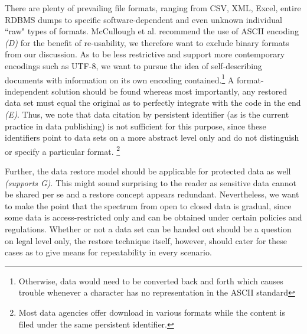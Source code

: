 \documentclass{acm_proc_article-sp}
\begin{document}
There are plenty of prevailing file formats, ranging from CSV, XML, Excel, entire RDBMS dumps to specific software-dependent and even unknown individual ``raw" types of formats.
McCullough et al. recommend the use of ASCII encoding \textit{(D)} for the benefit of re-usability, we therefore want to exclude binary formats from our discussion.
As to be less restrictive and support more contemporary encodings such as UTF-8, we want to pursue the idea of self-describing documents with information on its own encoding contained.\footnote{Otherwise, data would need to be converted back and forth which causes trouble whenever a character has no representation in the ASCII standard}
A format-independent solution should be found whereas most importantly, any restored data set must equal the original as to perfectly integrate with the code in the end \textit{(E)}. 
Thus, we note that data citation by persistent identifier (as is the current practice in data publishing) is not sufficient for this purpose, since these identifiers point to data sets on a more abstract level only and do not distinguish or specify a particular format.
\footnote{Most data agencies offer download in various formats while the content is filed under the same persistent identifier.}

  
Further, the data restore model should be applicable for protected data as well \textit{(supports G)}.
This might sound surprising to the reader as sensitive data cannot be shared per se and a restore concept appears redundant.
Nevertheless, we want to make the point that the spectrum from open to closed data is gradual, since some data is access-restricted only and can be obtained under certain policies and regulations.
Whether or not a data set can be handed out should be a question on legal level only, the restore technique itself, however, should cater for these cases as to give means for repeatability in every scenario.
\end{document}
